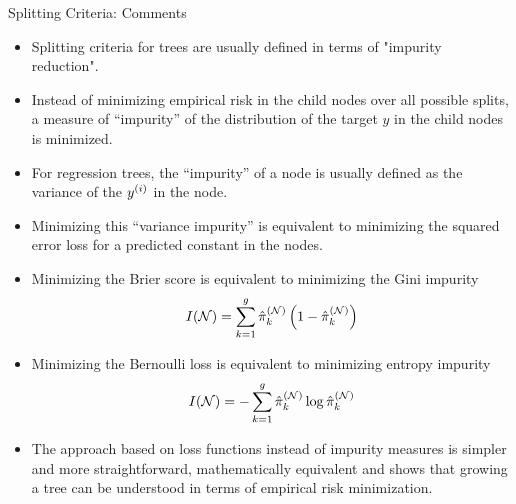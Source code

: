 \documentclass[11pt,compress,t,notes=noshow, xcolor=table]{beamer}
\begin{document}
\begin{vbframe}{Splitting Criteria: Comments}

\begin{itemize}
\item Splitting criteria for trees are usually defined in terms of "impurity reduction". 
\item Instead of minimizing empirical risk in the child nodes over all possible splits, a measure of \enquote{impurity} of the distribution of the target $y$ in the child nodes is minimized. 
\item For regression trees, the \enquote{impurity} of a node is usually defined as the variance of the $y^{(i)}$ in the node. 
\item Minimizing this \enquote{variance impurity} is equivalent to minimizing the squared error loss for a predicted constant in the nodes. 

\framebreak 

\item Minimizing the Brier score is equivalent to minimizing the Gini impurity
$$I(\mathcal{N}) = \sum\limits_{k=1}^g \hat\pi_k^{(\mathcal{N})} \left( 1-\hat\pi_k^{(\mathcal{N})} \right)$$
\item Minimizing the Bernoulli loss is equivalent to minimizing entropy impurity
$$I(\mathcal{N}) = -\sum\limits_{k=1}^g \hat\pi_k^{(\mathcal{N})} \log \hat\pi_k^{(\mathcal{N})}$$
\item The approach based on loss functions instead of impurity measures is simpler and more straightforward, mathematically equivalent and shows that growing a tree can be understood in terms of empirical risk minimization.
\end{itemize}
\end{vbframe}
\end{document}
